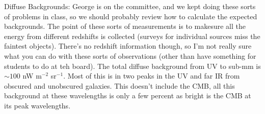 Diffuse Backgrounds:\newline
George is on the committee, and we kept doing these sorts of problems in 
class, so we should probably review how to calculate the expected backgrounds.  
The point of these sorts of measurements is to makesure all the energy 
from different redshifts is collected (surveys for individual sources 
miss the faintest objects).  There's no redshift information though, so I'm not 
really sure what you can do with these sorts of observations (other than 
have something for students to do at teh board).  The total diffuse 
background from UV to sub-mm is $\sim100$ nW m$^{-2}$ sr$^{-1}$.  Most of 
this is in two peaks in the UV and far IR from obscured and unobscured 
galaxies.  This doesn't include the CMB, all this background at these 
wavelengths is only a few percent as bright is the CMB at its peak 
wavelengths.  


